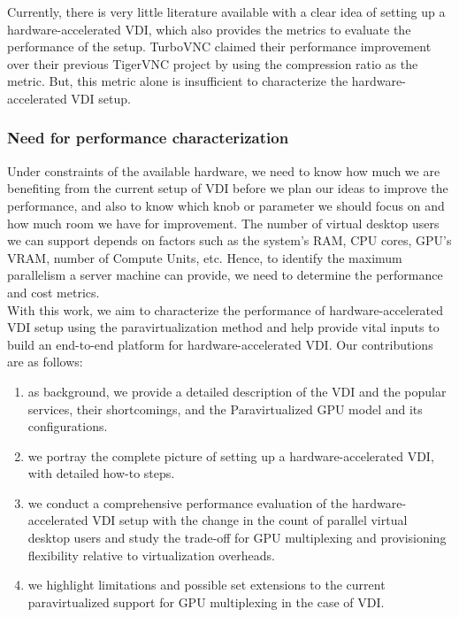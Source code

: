 \documentclass[a4paper,12pt, final]{report}
\begin{document}
\noindent Currently, there is very little literature available with a clear idea of setting up a hardware-accelerated VDI, which also provides the metrics to evaluate the performance of the setup. TurboVNC claimed their performance improvement over their previous TigerVNC project by using the compression ratio as the metric. But, this metric alone is insufficient to characterize the hardware-accelerated VDI setup.\\

\subsubsection{Need for performance characterization}
Under constraints of the available hardware, we need to know how much we are benefiting from the current setup of VDI before we plan our ideas to improve the performance, and also to know which knob or parameter we should focus on and how much room we have for improvement. The number of virtual desktop users we can support depends on factors such as the system's RAM, CPU cores, GPU's VRAM, number of Compute Units, etc. Hence, to identify the maximum parallelism a server machine can provide, we need to determine the performance and cost metrics.\\

\noindent With this work, we aim to characterize the performance of hardware-accelerated VDI setup using the paravirtualization method and help provide vital inputs to build an end-to-end platform for hardware-accelerated VDI. Our contributions are as follows: \\

\begin{enumerate}
    \item as background, we provide a detailed description of the VDI and the popular services, their shortcomings, and the Paravirtualized GPU model and its configurations.
    \item we portray the complete picture of setting up a hardware-accelerated VDI, with detailed how-to steps.
    \item we conduct a comprehensive performance evaluation of the hardware-accelerated VDI setup with the change in the count of parallel virtual desktop users and study the trade-off for GPU multiplexing and provisioning flexibility relative to virtualization overheads.
    \item we highlight limitations and possible set extensions to the current paravirtualized support for GPU multiplexing in the case of VDI.
\end{enumerate}
\end{document}

